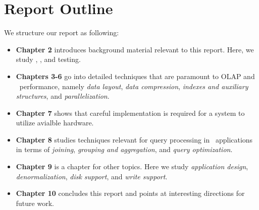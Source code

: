 \section{Report Outline}
\label{sec:Thesis Outline}
We structure our report as following:
\begin{itemize}
  \item \textbf{Chapter 2} introduces background material relevant to this report. Here, we study \bi, \bd, and testing.
  \item \textbf{Chapters 3-6} go into detailed techniques that are paramount to OLAP and \bd~performance, namely \textit{data layout}, \textit{data compression}, \textit{indexes and auxiliary structures}, and \textit{parallelization}.
  \item \textbf{Chapter 7} shows that careful implementation is required for a system to utilize avialble hardware. 
  \item \textbf{Chapter 8} studies techniques relevant for query processing in \bd~applications in terms of \textit{joining}, \textit{grouping and aggregation}, and \textit{query optimization}.
  \item \textbf{Chapter 9} is a chapter for other topics. Here we study \textit{application design}, \textit{denormalization}, \textit{disk support}, and \textit{write support}.
  \item \textbf{Chapter 10} concludes this report and points at interesting directions for future work.
\end{itemize}
